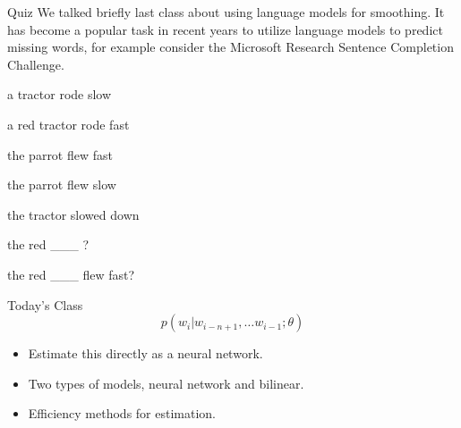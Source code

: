 \documentclass{beamer}
\begin{document}
\begin{frame}{Quiz}
  We talked briefly last class about using language models for smoothing. 
  It has become a popular task in recent years to utilize language models to predict 
  missing words, for example consider the Microsoft Research Sentence Completion Challenge.

  \begin{center}
    a tractor rode slow

    a red tractor rode fast

    the parrot flew fast

    the parrot flew slow
    
    the tractor slowed down


    the  red \_\_\_ ?

    the  red \_\_\_ flew fast?
  \end{center}

\end{frame}



\begin{frame}
\end{frame}


\begin{frame}{Today's Class }
  \[ p(w_i | w_{i-n+1}, \ldots w_{i-1}; \theta) \] 

  \begin{itemize}
  \item Estimate this directly as a neural network.
    \air 

  \item Two types of models, neural network and bilinear. 
    \air 

  \item Efficiency methods for estimation.
  \end{itemize}
\end{frame}
\end{document}
